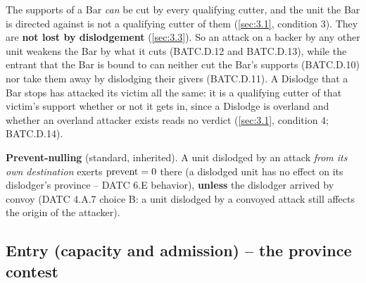 \documentclass[12pt,a4paper]{article}
\begin{document}
The supports of a Bar \emph{can} be cut by every qualifying cutter, and the unit the Bar is directed against is not a qualifying cutter of them (\cref{sec:3.1}, condition 3).
They are \textbf{not lost by dislodgement} (\cref{sec:3.3}).
So an attack on a backer by any other unit weakens the Bar by what it cuts (BATC.D.12 and BATC.D.13), while the entrant that the Bar is bound to can neither cut the Bar's supports (BATC.D.10) nor take them away by dislodging their givers (BATC.D.11).
A Dislodge that a Bar stops has attacked its victim all the same: it is a qualifying cutter of that victim's support whether or not it gets in, since a Dislodge is overland and whether an overland attacker exists reads no verdict (\cref{sec:3.1}, condition 4; BATC.D.14).

\textbf{Prevent-nulling} (standard, inherited).
A unit dislodged by an attack \emph{from its own destination} exerts $\operatorname{prevent} = 0$ there (a dislodged unit has no effect on its dislodger's province -- DATC 6.E behavior), \textbf{unless} the dislodger arrived by convoy (DATC 4.A.7 choice B: a unit dislodged by a convoyed attack still affects the origin of the attacker).

\subsection{Entry (capacity and admission) -- the province contest}\label{sec:4.3}
\end{document}
